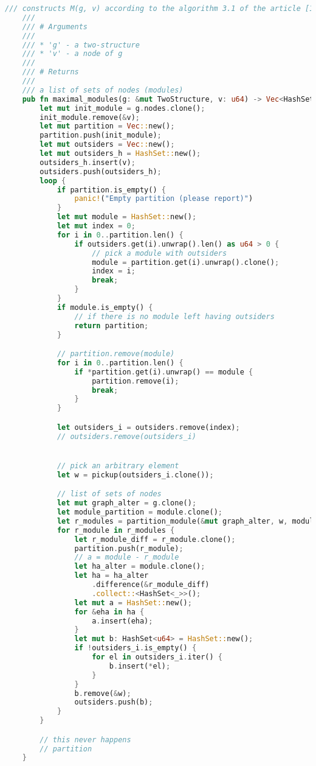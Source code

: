 \begin{lstlisting}[language=Rust, style=rust, caption={Defining the maximal modules with Rust}, label={lst:rust-define-maximal-modules}, firstnumber=1]
    /// constructs M(g, v) according to the algorithm 3.1 of the article [1]
    ///
    /// # Arguments
    ///
    /// * 'g' - a two-structure
    /// * 'v' - a node of g
    ///
    /// # Returns
    ///
    /// a list of sets of nodes (modules)
    pub fn maximal_modules(g: &mut TwoStructure, v: u64) -> Vec<HashSet<u64>> {
        let mut init_module = g.nodes.clone();
        init_module.remove(&v);
        let mut partition = Vec::new();
        partition.push(init_module);
        let mut outsiders = Vec::new();
        let mut outsiders_h = HashSet::new();
        outsiders_h.insert(v);
        outsiders.push(outsiders_h);
        loop {
            if partition.is_empty() {
                panic!("Empty partition (please report)")
            }
            let mut module = HashSet::new();
            let mut index = 0;
            for i in 0..partition.len() {
                if outsiders.get(i).unwrap().len() as u64 > 0 {
                    // pick a module with outsiders
                    module = partition.get(i).unwrap().clone();
                    index = i;
                    break;
                }
            }
            if module.is_empty() {
                // if there is no module left having outsiders
                return partition;
            }

            // partition.remove(module)
            for i in 0..partition.len() {
                if *partition.get(i).unwrap() == module {
                    partition.remove(i);
                    break;
                }
            }

            let outsiders_i = outsiders.remove(index);
            // outsiders.remove(outsiders_i)


            // pick an arbitrary element
            let w = pickup(outsiders_i.clone());

            // list of sets of nodes
            let mut graph_alter = g.clone();
            let module_partition = module.clone();
            let r_modules = partition_module(&mut graph_alter, w, module_partition);
            for r_module in r_modules {
                let r_module_diff = r_module.clone();
                partition.push(r_module);
                // a = module - r_module
                let ha_alter = module.clone();
                let ha = ha_alter
                    .difference(&r_module_diff)
                    .collect::<HashSet<_>>();
                let mut a = HashSet::new();
                for &eha in ha {
                    a.insert(eha);
                }
                let mut b: HashSet<u64> = HashSet::new();
                if !outsiders_i.is_empty() {
                    for el in outsiders_i.iter() {
                        b.insert(*el);
                    }
                }
                b.remove(&w);
                outsiders.push(b);
            }
        }

        // this never happens
        // partition
    }
\end{lstlisting}

